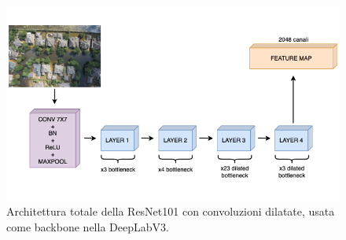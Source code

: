 \begin{figure}[h!]
    \centering
    \hspace*{-0in}
    \includegraphics[width=\textwidth]{img/resnet_2.png}
    \caption{Architettura totale della ResNet101 con convoluzioni dilatate, usata come backbone nella DeepLabV3.}
    \label{fig:arch_resnet}
\end{figure}


